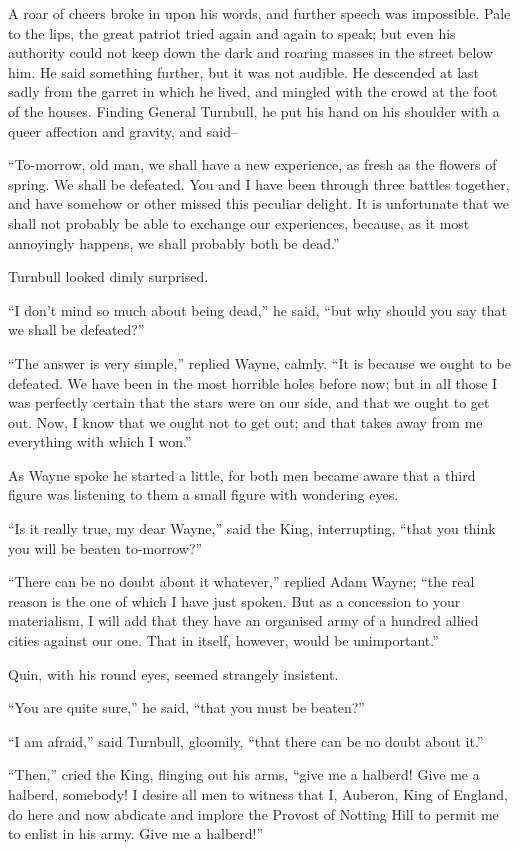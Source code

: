 \documentclass{book}
\begin{document}
A roar of cheers broke in upon his words, and further speech was impossible. Pale to the lips, the great patriot tried again and again to speak; but even his authority could not keep down the dark and roaring masses in the street below him. He said something further, but it was not audible. He descended at last sadly from the garret in which he lived, and mingled with the crowd at the foot of the houses. Finding General Turnbull, he put his hand on his shoulder with a queer affection and gravity, and said–

“To-morrow, old man, we shall have a new experience, as fresh as the flowers of spring. We shall be defeated. You and I have been through three battles together, and have somehow or other missed this peculiar delight. It is unfortunate that we shall not probably be able to exchange our experiences, because, as it most annoyingly happens, we shall probably both be dead.”

Turnbull looked dimly surprised.

“I don’t mind so much about being dead,” he said, “but why should you say that we shall be defeated?”

“The answer is very simple,” replied Wayne, calmly. “It is because we ought to be defeated. We have been in the most horrible holes before now; but in all those I was perfectly certain that the stars were on our side, and that we ought to get out. Now, I know that we ought not to get out; and that takes away from me everything with which I won.”

As Wayne spoke he started a little, for both men became aware that a third figure was listening to them a small figure with wondering eyes.

“Is it really true, my dear Wayne,” said the King, interrupting, “that you think you will be beaten to-morrow?”

“There can be no doubt about it whatever,” replied Adam Wayne; “the real reason is the one of which I have just spoken. But as a concession to your materialism, I will add that they have an organised army of a hundred allied cities against our one. That in itself, however, would be unimportant.”

Quin, with his round eyes, seemed strangely insistent.

“You are quite sure,” he said, “that you must be beaten?”

“I am afraid,” said Turnbull, gloomily, “that there can be no doubt about it.”

“Then,” cried the King, flinging out his arms, “give me a halberd! Give me a halberd, somebody! I desire all men to witness that I, Auberon, King of England, do here and now abdicate and implore the Provost of Notting Hill to permit me to enlist in his army. Give me a halberd!”
\end{document}

